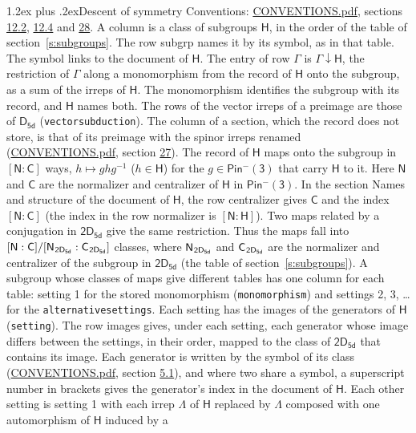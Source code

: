 \documentclass[10pt,a4paper]{article}
\makeatletter
\renewcommand\section{\@startsection{section}{1}{\z@}{-3ex plus -1ex minus -.2ex}%
  {1.2ex plus .2ex}{\normalfont\large\sffamily\bfseries\color{parttitle}}}
\numberwithin{equation}{section}
\newcommand{\grp}[1]{\mathsf{#1}}
\newcommand{\grpindex}[2]{[#1 : #2]}
\newcommand{\restr}[2]{#1\!\downarrow#2}
\newcommand{\hairsp}{\mkern1mu}
\makeatother
\begin{document}
\section{Descent of symmetry}\label{s:subduction}
Conventions: \href{../../CONVENTIONS.pdf}{CONVENTIONS.pdf}, sections \href{../../../rotation/CONVENTIONS.pdf\#conv.12.2}{12.2}, \href{../../../rotation/CONVENTIONS.pdf\#conv.12.4}{12.4} and \href{../../CONVENTIONS.pdf\#conv.28}{28}.
A column is a class of subgroups $\grp{H}$, in the order of the table of section~\ref{s:subgroups}. The row subgrp names it by its symbol, as in that table. The symbol links to the document of $\grp{H}$. The entry of row $\Gamma$ is $\restr{\Gamma}{\grp{H}}$, the restriction of $\Gamma$ along a monomorphism from the record of $\grp{H}$ onto the subgroup, as a sum of the irreps of $\grp{H}$. The monomorphism identifies the subgroup with its record, and $\grp{H}$ names both. The rows of the vector irreps of a preimage are those of \href{../../../rotation/data/pdf/D5d.pdf}{$\grp{D_{5d}}$} (\texttt{vectorsubduction}). The column of a section, which the record does not store, is that of its preimage with the spinor irreps renamed (\href{../../CONVENTIONS.pdf}{CONVENTIONS.pdf}, section \href{../../CONVENTIONS.pdf\#conv.27}{27}). \label{n:group.normalizer.o3}\label{n:group.centralizer.o3}\label{n:element.h}The record of $\grp{H}$ maps onto the subgroup in $\grpindex{\grp{N}}{\grp{C}}$ ways, $h \mapsto g h g^{-1}$ ($h \in \grp{H}$) for the $g \in \grp{Pin^{-}(3)}$ that carry $\grp{H}$ to it. Here $\grp{N}$ and $\grp{C}$ are the normalizer and centralizer of $\grp{H}$ in \href{Pinminus3.pdf}{$\grp{Pin^{-}(3)}$}. In the section Names and structure of the document of $\grp{H}$, the row centralizer gives $\grp{C}$ and the index $\grpindex{\grp{N}}{\grp{C}}$ (the index in the row normalizer is $\grpindex{\grp{N}}{\grp{H}}$). Two maps related by a conjugation in $\grp{2D_{5d}}$ give the same restriction. Thus the maps fall into $\grpindex{\grp{N}}{\grp{C}}/\grpindex{\grp{N}_{\hairsp \grp{2D_{5d}}}}{\grp{C}_{\hairsp \grp{2D_{5d}}}}$ classes, where $\grp{N}_{\hairsp \grp{2D_{5d}}}$ and $\grp{C}_{\hairsp \grp{2D_{5d}}}$ are the normalizer and centralizer of the subgroup in $\grp{2D_{5d}}$ (the table of section~\ref{s:subgroups}). \label{n:head.setting}A subgroup whose classes of maps give different tables has one column for each table: setting 1 for the stored monomorphism (\texttt{monomorphism}) and settings 2, 3, \dots{} for the \texttt{alternativesettings}. Each setting has the images of the generators of $\grp{H}$ (\texttt{setting}). \label{n:head.images}The row images gives, under each setting, each generator whose image differs between the settings, in their order, mapped to the class of $\grp{2D_{5d}}$ that contains its image. Each generator is written by the symbol of its class (\href{../../CONVENTIONS.pdf}{CONVENTIONS.pdf}, section \href{../../../rotation/CONVENTIONS.pdf\#conv.5.1}{5.1}), and where two share a symbol, a superscript number in brackets gives the generator's index in the document of $\grp{H}$. \label{n:irrep.Delta}Each other setting is setting 1 with each irrep $\Lambda$ of $\grp{H}$ replaced by $\Lambda$ composed with one automorphism of $\grp{H}$ induced by a 
\end{document}
